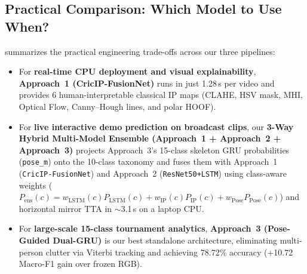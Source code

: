 \subsection{Practical Comparison: Which Model to Use When?}

\begin{table}[t]
\centering
\caption{\textbf{Practical comparison of our three approaches across speed, interpretability, and best use cases.}}
\label{tab:comparison_summary}
\end{table}

 summarizes the practical engineering trade-offs across our three pipelines:
\begin{itemize}
    \item For \textbf{real-time CPU deployment and visual explainability}, \textbf{Approach~1 (CricIP-FusionNet)} runs in just 1.28\,s per video and provides 6 human-interpretable classical IP maps (CLAHE, HSV mask, MHI, Optical Flow, Canny--Hough lines, and polar HOOF).
    \item For \textbf{live interactive demo prediction on broadcast clips}, our \textbf{3-Way Hybrid Multi-Model Ensemble (Approach~1 + Approach~2 + Approach~3)} projects Approach~3's 15-class skeleton GRU probabilities (\texttt{pose\_m}) onto the 10-class taxonomy and fuses them with Approach~1 (\texttt{CricIP-FusionNet}) and Approach~2 (\texttt{ResNet50+LSTM}) using class-aware weights ($P_{\text{ens}}(c) = w_{\text{LSTM}}(c) P_{\text{LSTM}}(c) + w_{\text{IP}}(c) P_{\text{IP}}(c) + w_{\text{Pose}} P_{\text{Pose}}(c)$) and horizontal mirror TTA in $\sim$3.1\,s on a laptop CPU.
    \item For \textbf{large-scale 15-class tournament analytics}, \textbf{Approach~3 (Pose-Guided Dual-GRU)} is our best standalone architecture, eliminating multi-person clutter via Viterbi tracking and achieving 78.72\% accuracy (+10.72 Macro-F1 gain over frozen RGB).
\end{itemize}

